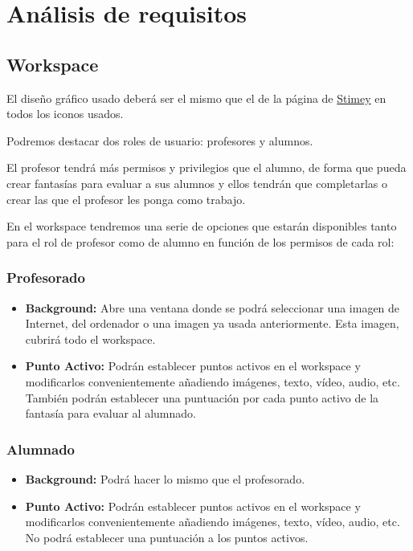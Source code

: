 \chapter{Análisis de requisitos}
\section{Workspace}
El diseño gráfico usado deberá ser el mismo que el de la página de \href{https://stimey.eu/home}{Stimey} en todos los iconos usados.

Podremos destacar dos roles de usuario: profesores y alumnos.

El profesor tendrá más permisos y privilegios que el alumno, de forma que pueda crear fantasías para evaluar a sus alumnos y ellos tendrán que completarlas o crear las que el profesor les ponga como trabajo.

En el workspace tendremos una serie de opciones que estarán disponibles tanto para el rol de profesor como de alumno en función de los permisos de cada rol:

\subsection{Profesorado}
\begin{itemize}
	\item \textbf{Background:} Abre una ventana donde se podrá seleccionar una imagen de Internet, del ordenador o una imagen ya usada anteriormente. Esta imagen, cubrirá todo el workspace.
	\item \textbf{Punto Activo:} Podrán establecer puntos activos en el workspace y modificarlos convenientemente añadiendo imágenes, texto, vídeo, audio, etc. También podrán establecer una puntuación por cada punto activo de la fantasía para evaluar al alumnado.
\end{itemize}

\subsection{Alumnado}
\begin{itemize}
	\item \textbf{Background:} Podrá hacer lo mismo que el profesorado.
	\item \textbf{Punto Activo:} Podrán establecer puntos activos en el workspace y modificarlos convenientemente añadiendo imágenes, texto, vídeo, audio, etc. No podrá establecer una puntuación a los puntos activos.
\end{itemize}

